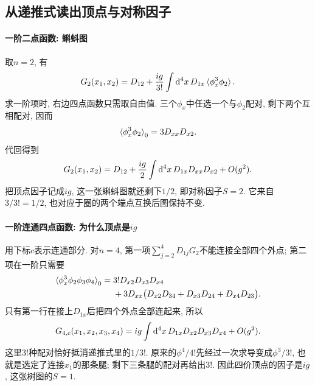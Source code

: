 \subsection{从递推式读出顶点与对称因子}

\paragraph{一阶二点函数: 蝌蚪图}
取$n=2$, 有
\begin{equation}
    G_2(x_1,x_2)=D_{12}+\frac{ig}{3!}\int\mathrm d^4x\,D_{1x}\braket{\phi_x^3\phi_2}.
    \label{sd-phi4-two-point-exact}
\end{equation}
求一阶项时, 右边四点函数只需取自由值. 三个$\phi_x$中任选一个与$\phi_2$配对, 剩下两个互相配对, 因而
\begin{equation}
    \braket{\phi_x^3\phi_2}_0=3D_{xx}D_{x2}.
\end{equation}
代回得到
\begin{equation}
    G_2(x_1,x_2)=D_{12}+\frac{ig}{2}\int\mathrm d^4x\,D_{1x}D_{xx}D_{x2}+O(g^2).
    \label{sd-phi4-tadpole}
\end{equation}
把顶点因子记成$ig$, 这一张蝌蚪图就还剩下$1/2$, 即对称因子$S=2$. 它来自$3/3!=1/2$, 也对应于圈的两个端点互换后图保持不变.

\paragraph{一阶连通四点函数: 为什么顶点是$ig$}
用下标$c$表示连通部分. 对$n=4$, 第一项$\sum_{j=2}^4D_{1j}G_2$不能连接全部四个外点; 第二项在一阶只需要
\begin{align}
    \braket{\phi_x^3\phi_2\phi_3\phi_4}_0
    ={}&3!D_{x2}D_{x3}D_{x4}\notag\\
    &+3D_{xx}\big(D_{x2}D_{34}+D_{x3}D_{24}+D_{x4}D_{23}\big).
\end{align}
只有第一行在接上$D_{1x}$后把四个外点全部连起来, 所以
\begin{equation}
    G_{4,c}(x_1,x_2,x_3,x_4)
    =ig\int\mathrm d^4x\,D_{1x}D_{x2}D_{x3}D_{x4}+O(g^2).
    \label{sd-phi4-tree}
\end{equation}
这里$3!$种配对恰好抵消递推式里的$1/3!$. 原来的$\phi^4/4!$先经过一次求导变成$\phi^3/3!$, 也就是选定了连接$x_1$的那条腿; 剩下三条腿的配对再给出$3!$. 因此四价顶点的因子是$ig$, 这张树图的$S=1$.

